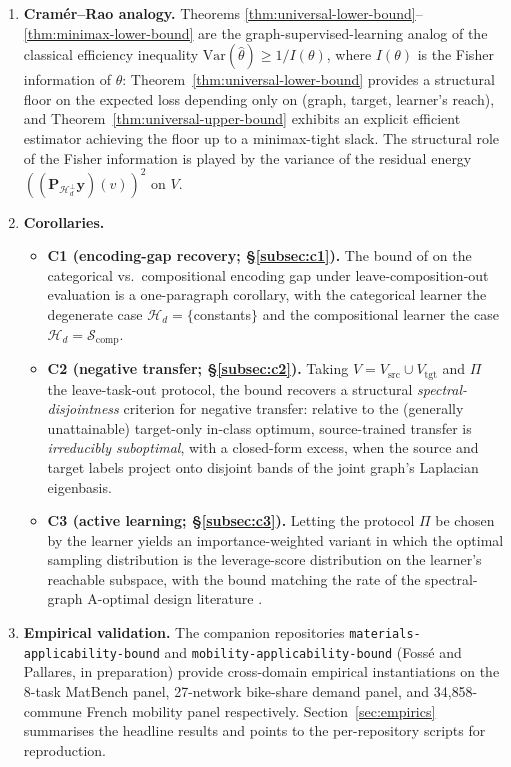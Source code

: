 \documentclass[11pt,a4paper]{article}
\theoremstyle{plain}
\theoremstyle{definition}
\theoremstyle{remark}
\newcommand{\by}{\mathbf{y}}
\newcommand{\bP}{\mathbf{P}}
\newcommand{\Var}{\mathrm{Var}}
\newcommand{\Scal}{\mathcal{S}}
\newcommand{\Hcal}{\mathcal{H}}
\begin{document}
\begin{enumerate}[label=(\arabic*),leftmargin=*]
\item \textbf{Cram\'er--Rao analogy.}  Theorems
    \ref{thm:universal-lower-bound}--\ref{thm:minimax-lower-bound} are
    the graph-supervised-learning analog of the classical efficiency
    inequality $\Var(\hat\theta) \geq 1/I(\theta)$, where $I(\theta)$
    is the Fisher information of $\theta$:
    Theorem~\ref{thm:universal-lower-bound} provides a structural
    floor on the expected loss depending only on (graph, target,
    learner's reach), and Theorem~\ref{thm:universal-upper-bound}
    exhibits an explicit efficient estimator achieving the floor up to a
    minimax-tight slack.  The structural role of the Fisher information
    is played by the variance of the residual energy
    $((\bP_{\Hcal_d^\perp}\by)(v))^2$ on $V$.

\item \textbf{Corollaries.}
    \begin{itemize}[label=$\bullet$,leftmargin=*]
    \item \textbf{C1 (encoding-gap recovery; \S\ref{subsec:c1}).}  The
        bound of \citet{FossePallares2026applicabilityBound} on the categorical
        vs.\ compositional encoding gap under leave-composition-out
        evaluation is a one-paragraph corollary, with the categorical
        learner the degenerate case $\Hcal_d = \{$constants$\}$ and
        the compositional learner the case $\Hcal_d = \Scal_{\mathrm{comp}}$.
    \item \textbf{C2 (negative transfer; \S\ref{subsec:c2}).}  Taking
        $V = V_{\mathrm{src}} \cup V_{\mathrm{tgt}}$ and $\Pi$ the
        leave-task-out protocol, the bound recovers a structural
        \emph{spectral-disjointness} criterion for negative transfer:
        relative to the (generally unattainable) target-only in-class
        optimum, source-trained transfer is \emph{irreducibly
        suboptimal}, with a closed-form excess, when the source and
        target labels project onto disjoint bands of the joint graph's
        Laplacian eigenbasis.
    \item \textbf{C3 (active learning; \S\ref{subsec:c3}).}  Letting the
        protocol $\Pi$ be chosen by the learner yields an
        importance-weighted variant in which the optimal sampling
        distribution is the leverage-score distribution on the learner's
        reachable subspace, with the bound matching the rate of the
        spectral-graph A-optimal design literature
        \citep{DrineasMahoney2018,Avron2017}.
    \end{itemize}

\item \textbf{Empirical validation.}  The companion repositories
    \texttt{materials-applicability-bound}
    \citep{FossePallares2026applicabilityBound} and
    \texttt{mobility-applicability-bound} (Foss\'e and Pallares, in
    preparation) provide cross-domain empirical instantiations on the
    8-task MatBench panel, 27-network bike-share demand panel, and
    34{,}858-commune French mobility panel respectively.
    Section~\ref{sec:empirics} summarises the headline results and
    points to the per-repository scripts for reproduction.
\end{enumerate}
\end{document}
